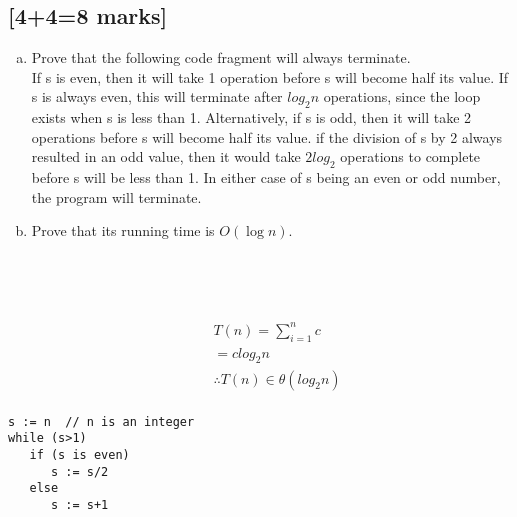 \documentclass[12pt]{article}
\begin{document}
\subsection{[4+4=8 marks]}
\begin{enumerate}[(a)]
\item Prove that the following code fragment will always terminate.\\
If s is even, then it will take 1 operation before s will become half its value. If s is always even, this will terminate after $log_2n$ operations, since the loop exists when s is less than 1. Alternatively, if s is odd, then it will take 2 operations before s will become half its value. if the division of s by 2 always resulted in an odd value, then it would take $2log_2$ operations to complete before s will be less than 1. In either case of s being an even or odd number, the program will terminate.
\item Prove that its running time is $O(\log n)$.\\
\\\\
\\ \\
\begin{align*}
&T(n) = \sum_{i=1}^n c\\
&=clog_2n\\
&\therefore T(n) \in \theta(log_2n)\\
\end{align*}
  \end{enumerate}
\begin{verbatim}
s := n  // n is an integer
while (s>1)
   if (s is even)
      s := s/2
   else
      s := s+1
\end{verbatim}
\end{document}
